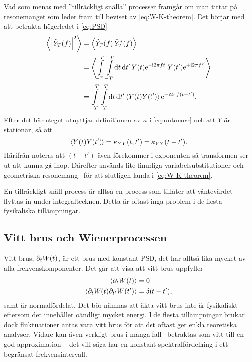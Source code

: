 Vad som menas med ''tillräckligt snälla'' processer framgår om man tittar på resonemanget som leder fram till beviset av \eqref{eq:W-K-theorem}. Det börjar med att betrakta högerledet i \eqref{eq:PSD}
\begin{equation}
\begin{aligned}
\ev{\abs{\hat{Y}_T(f)}^2}&=\ev{\hat{Y}_T(f)\,\hat{Y}_T^*(f)}\\
&=\ev{
\int_{-T}^T\int_{-T}^T\!\dd{t}\dd{t'} Y(t)\ee^{-\ii 2\pi ft}
 \;Y(t')\ee^{+\ii 2\pi ft'}
}\\
&=\int_{-T}^T\int_{-T}^T\!\dd{t}\dd{t'} 
\ev{Y(t)Y(t')} \ee^{-\ii 2\pi f(t-t')}.
\end{aligned}
\end{equation}
Efter det här steget utnyttjas definitionen av $\kappa$ i \eqref{eq:autocorr} och att $Y$ är stationär, så att
\begin{equation}
\ev{Y(t)Y(t')} = \kappa_{YY}(t, t') = \kappa_{YY}(t-t').
\end{equation}
Härifrån noteras att $(t-t')$ även förekommer i exponenten så transformen ser ut att kunna gå ihop. Därefter används lite finurliga variabelsubstitutioner och geometriska resonemang~\cite{Miller_probability2012} för att slutligen landa i \eqref{eq:W-K-theorem}.

En tillräckligt snäll process är alltså en process som tillåter att väntevärdet flyttas in under integraltecknen. Detta är oftast inga problem i de flesta fysikaliska tillämpningar. 


\subsection{Vitt brus och Wienerprocessen}\label{sec:white_noise}
Vitt brus, $\partial_tW(t)$,\footnotemark{} är ett brus med konstant PSD, det har alltså lika mycket av alla frekvenskomponenter. Det går att visa att vitt brus uppfyller \cite{Miller_probability2012}
\begin{equation}\label{eq:white_noise}
\begin{aligned}
\ev{\pd_tW(t)}&=0 \\
\ev{\pd_tW(t)\pd_{t'}W(t')}&=  \delta(t-t'),
\end{aligned}
\end{equation}
samt är normalfördelat. 
Det bör nämnas att äkta vitt brus inte är fysikaliskt eftersom det innehåller oändligt mycket energi. I de flesta tillämpningar brukar dock fluktuationer antas vara vitt brus för att det oftast ger enkla teoretiska analyser. Vidare kan även verkligt brus i många fall~\cite{Engelberg_noise2007} betraktas som vitt till en god approximation -- det vill säga har en konstant spektralfördelning i ett begränsat frekvensintervall. 

